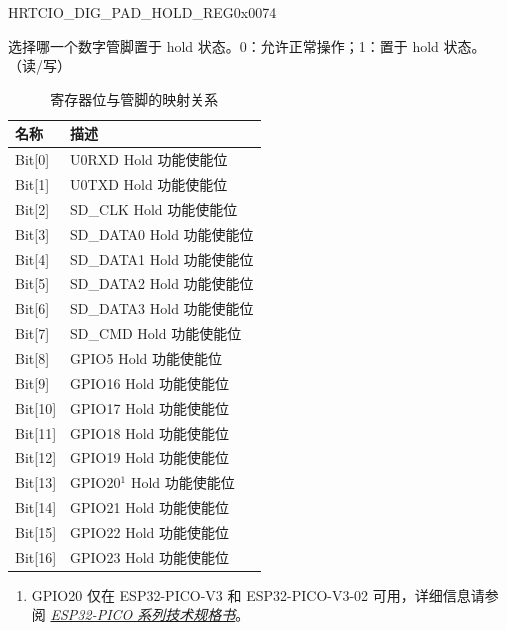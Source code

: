 \clearpage
\begin{register}{H}{RTCIO\_DIG\_PAD\_HOLD\_REG}{0x0074}\label{regdesc:RTCIODIGPADHOLDREG}
%
\regnewline%
\begin{regdesc}\begin{reglist}
\item [RTCIO\_DIG\_PAD\_HOLD\_REG]选择哪一个数字管脚置于 hold 状态。0：允许正常操作；1：置于 hold 状态。（读/写）
\end{reglist}\end{regdesc}
\end{register}

\begin{longtable}[c]{ | p{5.5cm} | p{7.5cm} | }
\caption{寄存器位与管脚的映射关系}\label{tab:hold-bit-mapping}
\\\hline
\rowcolor{lightgray}
\textbf{名称} & \textbf{描述} \\ \hline
\endhead
Bit[0] & U0RXD Hold 功能使能位\\\hline
Bit[1] & U0TXD Hold 功能使能位\\\hline
Bit[2] & SD\_CLK Hold 功能使能位\\\hline
Bit[3] & SD\_DATA0 Hold 功能使能位\\\hline
Bit[4] & SD\_DATA1 Hold 功能使能位\\\hline
Bit[5] & SD\_DATA2 Hold 功能使能位\\\hline
Bit[6] & SD\_DATA3 Hold 功能使能位\\\hline
Bit[7] & SD\_CMD Hold 功能使能位\\\hline
Bit[8] & GPIO5 Hold 功能使能位\\\hline
Bit[9] & GPIO16 Hold 功能使能位\\\hline
Bit[10] & GPIO17 Hold 功能使能位\\\hline
Bit[11] & GPIO18 Hold 功能使能位\\\hline
Bit[12] & GPIO19 Hold 功能使能位\\\hline
Bit[13] & GPIO20$^1$ Hold 功能使能位\\\hline
Bit[14] & GPIO21 Hold 功能使能位\\\hline
Bit[15] & GPIO22 Hold 功能使能位\\\hline
Bit[16] & GPIO23 Hold 功能使能位\\\hline
\end{longtable}

\vspace {-1em}
\begin{small}
\begin{enumerate}
  \item GPIO20 仅在 ESP32-PICO-V3 和 ESP32-PICO-V3-02 可用，详细信息请参阅 \href{https://www.espressif.com/sites/default/files/documentation/esp32-pico_series_datasheet_cn.pdf}{\textit{ESP32-PICO 系列技术规格书}}。\\
\end{enumerate}
\end{small}


